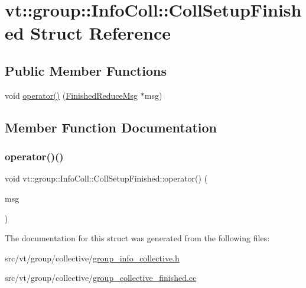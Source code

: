 \hypertarget{structvt_1_1group_1_1_info_coll_1_1_coll_setup_finished}{}\section{vt\+:\+:group\+:\+:Info\+Coll\+:\+:Coll\+Setup\+Finished Struct Reference}
\label{structvt_1_1group_1_1_info_coll_1_1_coll_setup_finished}
\subsection*{Public Member Functions}
\begin{DoxyCompactItemize}
\item 
void \hyperlink{structvt_1_1group_1_1_info_coll_1_1_coll_setup_finished_aad0f33764bfb5935da8e1ea6d8758df7}{operator()} (\hyperlink{structvt_1_1group_1_1_finished_reduce_msg}{Finished\+Reduce\+Msg} $\ast$msg)
\end{DoxyCompactItemize}


\subsection{Member Function Documentation}
\mbox{\label{structvt_1_1group_1_1_info_coll_1_1_coll_setup_finished_aad0f33764bfb5935da8e1ea6d8758df7}} 
\subsubsection{\texorpdfstring{operator()()}{operator()()}}
{\footnotesize\ttfamily void vt\+::group\+::\+Info\+Coll\+::\+Coll\+Setup\+Finished\+::operator() (\begin{DoxyParamCaption}\item[{\hyperlink{structvt_1_1group_1_1_finished_reduce_msg}{Finished\+Reduce\+Msg} $\ast$}]{msg }\end{DoxyParamCaption})}



The documentation for this struct was generated from the following files\+:\begin{DoxyCompactItemize}
\item 
src/vt/group/collective/\hyperlink{group__info__collective_8h}{group\+\_\+info\+\_\+collective.\+h}\item 
src/vt/group/collective/\hyperlink{group__collective__finished_8cc}{group\+\_\+collective\+\_\+finished.\+cc}\end{DoxyCompactItemize}
